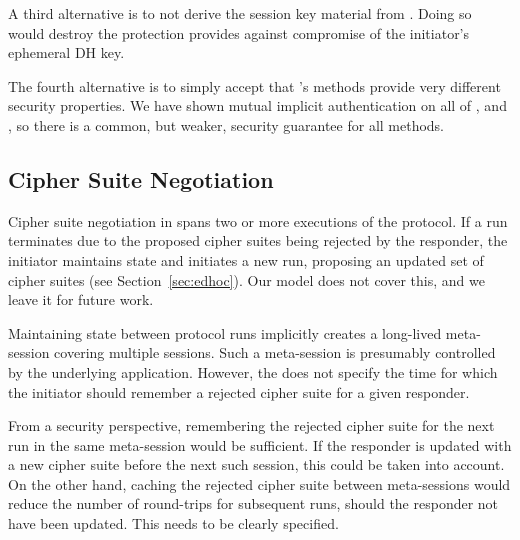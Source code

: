 \documentclass[runningheads, envcountsame, a4paper, draft, x11names]{llncs}
\begin{document}
A third alternative is to not derive the session key material from \mGiy{}.
%
Doing so would destroy the protection \mOptls{} provides against compromise
of the initiator's ephemeral DH key.
%

The fourth alternative is to simply
accept that \mEdhoc{}'s methods provide very different security properties.
%
We have shown mutual implicit authentication on all of \mGxy{}, \mGiy{} and
\mGrx{}, so there is a common, but weaker, security guarantee for all
methods.
%

\subsection{Cipher Suite Negotiation}
\label{sec:ciphersuiteNegotiation}
%
Cipher suite negotiation in \mEdhoc{} spans two or more executions of the
protocol.
%
If a run terminates due to the proposed cipher suites being rejected by the
responder, the initiator maintains state and initiates a new run, proposing
an updated set of cipher suites (see Section~\ref{sec:edhoc}).
%
Our model does not cover this, and we leave it for future work.

Maintaining state between protocol runs implicitly creates a long-lived
meta-session covering multiple \mEdhoc{} sessions.
%
Such a meta-session is presumably controlled by the underlying application.
%
However, the \mSpec{} does not specify the time for which the initiator should
remember a rejected cipher suite for a given responder.
%

From a security perspective, remembering the rejected cipher suite for the
next \mEdhoc{} run in the same meta-session would be sufficient.
%
If the responder is updated with a new cipher suite before the next such
session, this could be taken into account. On the other hand, caching the
rejected cipher suite between meta-sessions would reduce the number of
round-trips for subsequent runs, should the responder not have been updated.
%
This needs to be clearly specified.
\end{document}

